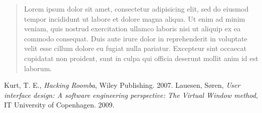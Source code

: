 \documentclass[a4paper,titlepage,final]{article}
\begin{document}



\setcounter{page}{0}

\begin{spacing}{1.5}
\begin{abstract}
	Lorem ipsum dolor sit amet, consectetur adipisicing elit, sed do eiusmod tempor incididunt ut labore et dolore magna aliqua. Ut enim ad minim veniam, quis nostrud exercitation ullamco laboris nisi ut aliquip ex ea commodo consequat. Duis aute irure dolor in reprehenderit in voluptate velit esse cillum dolore eu fugiat nulla pariatur. Excepteur sint occaecat cupidatat non proident, sunt in culpa qui officia deserunt mollit anim id est laborum.
\end{abstract}
\end{spacing}

\tableofcontents
\newpage

\begin{spacing}{1.5}



%
%
%
\end{spacing}

\newpage
{}
\begin{thebibliography}{9}
	  Kurt, T. E.,
	  \emph{Hacking Roomba},
	  Wiley Publishing.
	  2007.
	  Lauesen, Søren,
	  \emph{User interface design: A software engineering perspective: The Virtual Window method},
	  IT University of Copenhagen.
	  2009.
\end{thebibliography}

\newpage
\appendix
\end{document}
